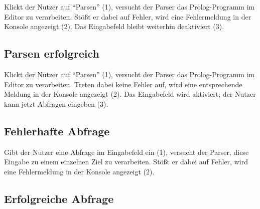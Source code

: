 \documentclass[parskip=full,11pt,twoside]{scrartcl}
\begin{document}
\begin{minipage}{\linewidth}
\end{minipage}

Klickt der Nutzer auf \enquote{Parsen} (1), versucht der Parser das Prolog-Programm im Editor zu verarbeiten.
Stößt er dabei auf Fehler, wird eine Fehlermeldung in der Konsole angezeigt (2).
Das Eingabefeld bleibt weiterhin deaktiviert (3).

\subsection{Parsen erfolgreich}

\begin{minipage}{\linewidth}
\end{minipage}

Klickt der Nutzer auf \enquote{Parsen} (1), versucht der Parser das Prolog-Programm im Editor zu verarbeiten.
Treten dabei keine Fehler auf, wird eine entsprechende Meldung in der Konsole angezeigt (2).
Das Eingabefeld wird aktiviert; der Nutzer kann jetzt Abfragen eingeben (3).

\subsection{Fehlerhafte Abfrage}

\begin{minipage}{\linewidth}
\end{minipage}

Gibt der Nutzer eine Abfrage im Eingabefeld ein (1), versucht der Parser, diese Eingabe zu einem einzelnen Ziel zu verarbeiten.
Stößt er dabei auf Fehler, wird eine Fehlermeldung in der Konsole angezeigt (2).

\subsection{Erfolgreiche Abfrage}
\end{document}
